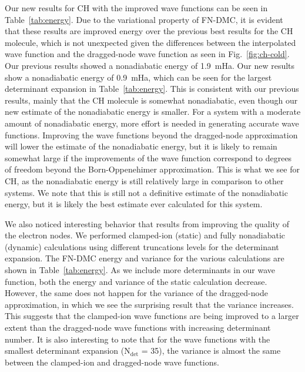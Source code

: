 \documentclass[aip,jcp,numerical,reprint]{revtex4-1}
\begin{document}
Our new results for CH with the improved wave functions can be seen in Table~\ref{tab:energy}.  Due to the variational property of FN-DMC, it is evident that these results are improved energy over the previous best results for the CH molecule, which is not unexpected given the differences between the interpolated wave function and the dragged-node wave function as seen in Fig.~\ref{fig:ch-cold}. Our previous results showed a nonadiabatic energy of 1.9~mHa. Our new results show a nonadiabatic energy of 0.9~mHa, which can be seen for the largest determinant expansion in Table~\ref{tab:energy}.  This is consistent with our previous results, mainly that the CH molecule is somewhat nonadiabatic, even though our new estimate of the nonadiabatic energy is smaller.  For a system with a moderate amount of nonadiabatic energy, more effort is needed in generating accurate wave functions.  Improving the wave functions beyond the dragged-node approximation will lower the estimate of the nonadiabatic energy, but it is likely to remain somewhat large if the improvements of the wave function correspond to degrees of freedom beyond the Born-Oppenehimer approximation. This is what we see for CH, as the nonadiabatic energy is still  relatively large in comparison to other systems.  We note that this is still not a definitive estimate of the nonadiabatic energy, but it is likely the best estimate ever calculated for this system.   


We also noticed interesting behavior that results from improving the quality of the electron nodes.  We performed clamped-ion (static) and fully nonadiabatic (dynamic) calculations using different truncations levels for the determinant expansion. The FN-DMC energy and variance for the various calculations are shown in Table~\ref{tab:energy}. As we include more determinants in our wave function, both the energy and variance of the static calculation decrease. %
However, the same does not happen for the variance of the dragged-node approximation, in which we see the surprising result that the variance increases.  This suggests that the clamped-ion wave functions are being improved to a larger extent than the dragged-node wave functions with increasing determinant number.  It is also interesting to note that for the wave functions with the smallest determinant expansion (N$_{\text{det}}$ = 35),  the variance is almost the same between the clamped-ion and dragged-node wave functions. 
\end{document}
